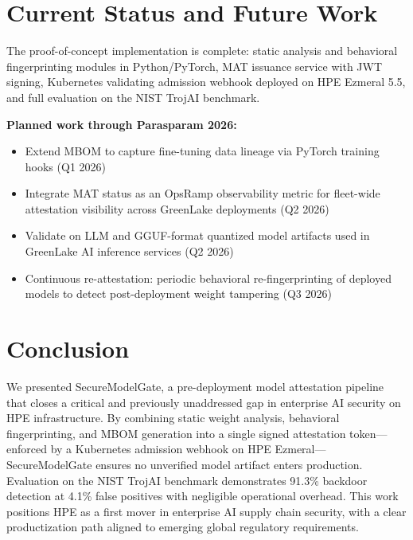 \documentclass[10pt,twocolumn]{article}
\begin{document}
\section{Current Status and Future Work}

The proof-of-concept implementation is complete: static analysis and behavioral
fingerprinting modules in Python/PyTorch, MAT issuance service with JWT signing,
Kubernetes validating admission webhook deployed on HPE Ezmeral 5.5, and
full evaluation on the NIST TrojAI benchmark.

\textbf{Planned work through Parasparam 2026:}
\begin{itemize}
  \item Extend MBOM to capture fine-tuning data lineage via PyTorch training
        hooks (Q1 2026)
  \item Integrate MAT status as an OpsRamp observability metric for fleet-wide
        attestation visibility across GreenLake deployments (Q2 2026)
  \item Validate on LLM and GGUF-format quantized model artifacts used in
        GreenLake AI inference services (Q2 2026)
  \item Continuous re-attestation: periodic behavioral re-fingerprinting of
        deployed models to detect post-deployment weight tampering (Q3 2026)
\end{itemize}

\section{Conclusion}

We presented SecureModelGate, a pre-deployment model attestation pipeline
that closes a critical and previously unaddressed gap in enterprise AI security
on HPE infrastructure. By combining static weight analysis, behavioral
fingerprinting, and MBOM generation into a single signed attestation token---
enforced by a Kubernetes admission webhook on HPE Ezmeral---SecureModelGate
ensures no unverified model artifact enters production. Evaluation on the NIST
TrojAI benchmark demonstrates 91.3\% backdoor detection at 4.1\% false positives
with negligible operational overhead. This work positions HPE as a first mover
in enterprise AI supply chain security, with a clear productization path aligned
to emerging global regulatory requirements.
\end{document}
